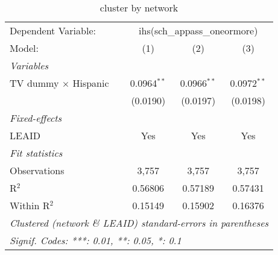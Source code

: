 \begin{table}[htbp]
\centering
\caption{cluster by network}
\begin{tabular}{lccc}
\tabularnewline\midrule\midrule
Dependent Variable:&\multicolumn{3}{c}{ihs(sch\_appass\_oneormore)}\\
Model:&(1) & (2) & (3)\\
\midrule \emph{Variables}&   &   &  \\
TV dummy $\times$ Hispanic & 0.0964$^{**}$ & 0.0966$^{**}$ & 0.0972$^{**}$\\
  &(0.0190) & (0.0197) & (0.0198)\\
\midrule \emph{Fixed-effects}&   &   &  \\
LEAID & Yes & Yes & Yes\\
\midrule \emph{Fit statistics}&  & & \\
Observations & 3,757&3,757&3,757\\
R$^2$ & 0.56806&0.57189&0.57431\\
Within R$^2$ & 0.15149&0.15902&0.16376\\
\midrule\midrule\multicolumn{4}{l}{\emph{Clustered (network \& LEAID) standard-errors in parentheses}}\\
\multicolumn{4}{l}{\emph{Signif. Codes: ***: 0.01, **: 0.05, *: 0.1}}\\
\end{tabular}
\end{table}

